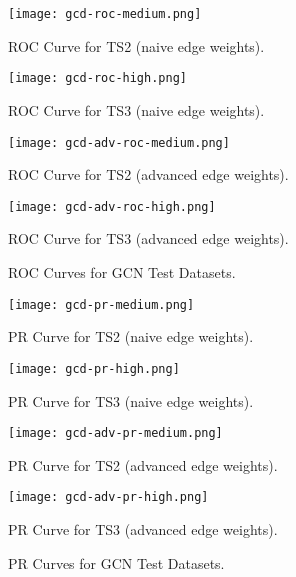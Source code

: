 \begin{figure}[htb]
  \centering
  \begin{minipage}{0.49\textwidth}
    \centering
    \texttt{[image: gcd-roc-medium.png]}
    \caption{ROC Curve for TS2 (naive edge weights).}
  \end{minipage}
  \begin{minipage}{0.49\textwidth}
    \centering
    \texttt{[image: gcd-roc-high.png]}
    \caption{ROC Curve for TS3 (naive edge weights).}
  \end{minipage}
  \begin{minipage}{0.49\textwidth}
    \centering
    \texttt{[image: gcd-adv-roc-medium.png]}
    \caption{ROC Curve for TS2 (advanced edge weights).}
  \end{minipage}
  \begin{minipage}{0.49\textwidth}
    \centering
    \texttt{[image: gcd-adv-roc-high.png]}
    \caption{ROC Curve for TS3 (advanced edge weights).}
  \end{minipage}  
  \caption{ROC Curves for GCN Test Datasets.}
  \label{fig:gcn-roc}
\end{figure}

\begin{figure}[htb]
  \centering
  \begin{minipage}{0.49\textwidth}
    \centering
    \texttt{[image: gcd-pr-medium.png]}
    \caption{PR Curve for TS2 (naive edge weights).}
  \end{minipage}
  \begin{minipage}{0.49\textwidth}
    \centering
    \texttt{[image: gcd-pr-high.png]}
    \caption{PR Curve for TS3 (naive edge weights).}
  \end{minipage}
  \begin{minipage}{0.49\textwidth}
    \centering
    \texttt{[image: gcd-adv-pr-medium.png]}
    \caption{PR Curve for TS2 (advanced edge weights).}
  \end{minipage}
  \begin{minipage}{0.49\textwidth}
    \centering
    \texttt{[image: gcd-adv-pr-high.png]}
    \caption{PR Curve for TS3 (advanced edge weights).}
  \end{minipage}  
  \caption{PR Curves for GCN Test Datasets.}
  \label{fig:gcn-pr}
\end{figure}

